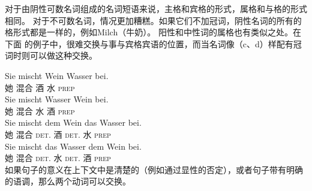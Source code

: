 对于由阴性可数名词组成的名词短语来说，主格和宾格的形式，属格和与格的形式相同。
对于不可数名词，情况更加糟糕。如果它们不加冠词，阴性名词的所有的格形式都是一样的，例如Milch（牛奶）。
阳性和中性词的属格也有类似之处。在下面 \citet[]{Wegener85b}的例子中，很难交换与事与宾格宾语的位置，而当名词像（c、d）样配有冠词时则可以做这种交换。

\eal
\ex 
\gll Sie mischt Wein Wasser bei.\\
     她 混合 酒 水 \textsc{prep} \\
\ex 
\gll Sie mischt Wasser Wein bei.\\
     她 混合 水 酒 \textsc{prep} \\
\ex 
\gll Sie mischt dem Wein das Wasser bei.\\
     她 混合 \textsc{det}.\dat{} 酒 \textsc{det}.\acc{} 水 \textsc{prep} \\ 
\ex 
\gll Sie mischt das Wasser dem Wein bei.\\
     她 混合 \textsc{det}.\acc{} 水 \textsc{det}.\dat{} 酒 \textsc{prep} \\ 
\zl
如果句子的意义在上下文中是清楚的（例如通过显性的否定），或者句子带有明确的语调，那么两个动词可以交换。

